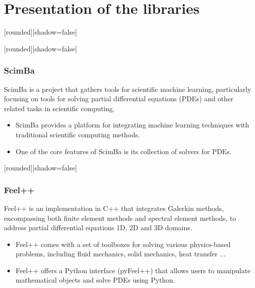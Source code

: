 \documentclass[10pt]{beamer}
\begin{document}
\section{Presentation of the libraries}
\begin{frame}
[rounded][shadow=false]

[rounded][shadow=false]
\frametitle{ScimBa}

ScimBa is a project that gathers tools for scientific machine learning, particularly focusing on tools for solving partial differential equations (PDEs) and other related tasks in scientific computing.

 \begin{itemize}
        \item ScimBa provides a platform for integrating machine learning techniques with traditional scientific computing methods. 
        

        \item One of the core features of ScimBa is its collection of solvers for PDEs. 
        
    \end{itemize}
\end{frame}
\begin{frame}
[rounded][shadow=false]
\frametitle{Feel++}

Feel++ is an implementation in C++ that integrates Galerkin methods, encompassing both finite element methods and spectral element methods, to address partial differential equations 1D, 2D and 3D domains.

 \begin{itemize}
        \item Feel++ comes with a set of toolboxes for solving various physics-based problems, including fluid mechanics, solid mechanics, heat transfer ... 
        



        \item Feel++ offers a Python interface (pyFeel++) that allows users to manipulate mathematical objects and solve PDEs using Python. 
        
        
        
    \end{itemize}
\end{frame}
\end{document}
